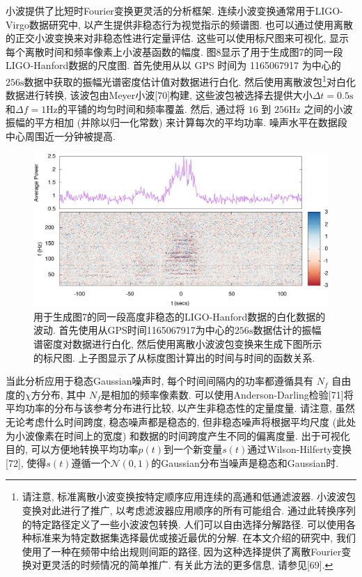 \documentclass[a4paper]{\documentclassname}
\def\t{\text}
\theoremstyle{definition}
\begin{document}
小波提供了比短时Fourier变换更灵活的分析框架. 连续小波变换通常用于LIGO-Virgo数据研究中, 以产生提供非稳态行为视觉指示的频谱图. 也可以通过使用离散的正交小波变换来对非稳态性进行定量评估. 这些可以使用标尺图来可视化, 显示每个离散时间和频率像素上小波基函数的幅度. 图8显示了用于生成图7的同一段LIGO-Hanford数据的尺度图. 首先使用从以 GPS 时间为 1165067917 为中心的 $256 \t{s}$数据中获取的振幅光谱密度估计值对数据进行白化. 然后使用离散波包\footnote{请注意, 标准离散小波变换按特定顺序应用连续的高通和低通滤波器. 小波波包变换对此进行了推广, 以考虑滤波器应用顺序的所有可能组合. 通过此转换序列的特定路径定义了一些小波波包转换. 人们可以自由选择分解路径. 可以使用各种标准来为特定数据集选择最优或接近最优的分解. 在本文介绍的研究中, 我们使用了一种在频带中给出规则间距的路径, 因为这种选择提供了离散Fourier变换对更灵活的时频情况的简单推广. 有关此方法的更多信息, 请参见[69]. }对白化数据进行转换, 该波包由Meyer小波[70]构建, 这些波包被选择去提供大小$\Delta t=0.5\t{s}$ 和$\Delta f=1\t{Hz}$的平铺的均匀时间和频率覆盖. 然后, 通过将 $16$ 到 $256 \t{Hz}$ 之间的小波振幅的平方相加 (并除以归一化常数) 来计算每次的平均功率. 噪声水平在数据段中心周围近一分钟被提高. 
\begin{figure}[htbp]
    \centering
    \includegraphics{img/8.jpg}
    \caption{
        用于生成图7的同一段高度非稳态的LIGO-Hanford数据的白化数据的波动. 首先使用从GPS时间1165067917为中心的$256 \t{s}$数据估计的振幅谱密度对数据进行白化, 然后使用离散小波波包变换来生成下图所示的标尺图. 上子图显示了从标度图计算出的时间与时间的函数关系. 
    }
\end{figure}

当此分析应用于稳态Gaussian噪声时, 每个时间间隔内的功率都遵循具有 $N_f$ 自由度的$\chi$方分布, 其中  $N_f$是相加的频率像素数. 可以使用Anderson-Darling检验[71]将平均功率的分布与该参考分布进行比较, 以产生非稳态性的定量度量. 请注意, 虽然无论考虑什么时间跨度, 稳态噪声都是稳态的, 但非稳态噪声将根据平均尺度 (此处为小波像素在时间上的宽度) 和数据的时间跨度产生不同的偏离度量. 出于可视化目的, 可以方便地转换平均功率$p(t)$到一个新变量$s(t)$通过Wilson-Hilferty变换[72], 使得$s(t)$遵循一个${{\mathcal N}} (0,1) $的Gaussian分布当噪声是稳态和Gaussian时. 
\end{document}

